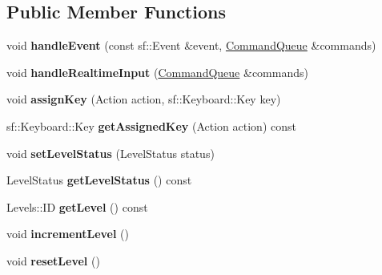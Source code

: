 \subsection*{Public Member Functions}
\begin{DoxyCompactItemize}
\item 
\hypertarget{class_player_ac84a4e0b787f92bf773ccd0d0483f5b1}{}void {\bfseries handle\+Event} (const sf\+::\+Event \&event, \hyperlink{class_command_queue}{Command\+Queue} \&commands)\label{class_player_ac84a4e0b787f92bf773ccd0d0483f5b1}

\item 
\hypertarget{class_player_ac520744c103fb38763c8856b4f158627}{}void {\bfseries handle\+Realtime\+Input} (\hyperlink{class_command_queue}{Command\+Queue} \&commands)\label{class_player_ac520744c103fb38763c8856b4f158627}

\item 
\hypertarget{class_player_ae7a6e190b35182eef75bb2aff219f90c}{}void {\bfseries assign\+Key} (Action action, sf\+::\+Keyboard\+::\+Key key)\label{class_player_ae7a6e190b35182eef75bb2aff219f90c}

\item 
\hypertarget{class_player_a210ce6683e3b945cf8d169a699ed527a}{}sf\+::\+Keyboard\+::\+Key {\bfseries get\+Assigned\+Key} (Action action) const \label{class_player_a210ce6683e3b945cf8d169a699ed527a}

\item 
\hypertarget{class_player_aac243333e2c74336db65d8758610ed28}{}void {\bfseries set\+Level\+Status} (Level\+Status status)\label{class_player_aac243333e2c74336db65d8758610ed28}

\item 
\hypertarget{class_player_a383770414300e65e805f88701aab0bdd}{}Level\+Status {\bfseries get\+Level\+Status} () const \label{class_player_a383770414300e65e805f88701aab0bdd}

\item 
\hypertarget{class_player_ae2824e8c862edb5308ed2ef984b0931e}{}Levels\+::\+I\+D {\bfseries get\+Level} () const \label{class_player_ae2824e8c862edb5308ed2ef984b0931e}

\item 
\hypertarget{class_player_a1f145598fdd3db45b9858fc00b97a61e}{}void {\bfseries increment\+Level} ()\label{class_player_a1f145598fdd3db45b9858fc00b97a61e}

\item 
\hypertarget{class_player_a37083ffc96dd066498f822bb79aa5c66}{}void {\bfseries reset\+Level} ()\label{class_player_a37083ffc96dd066498f822bb79aa5c66}


\end{DoxyCompactItemize}

